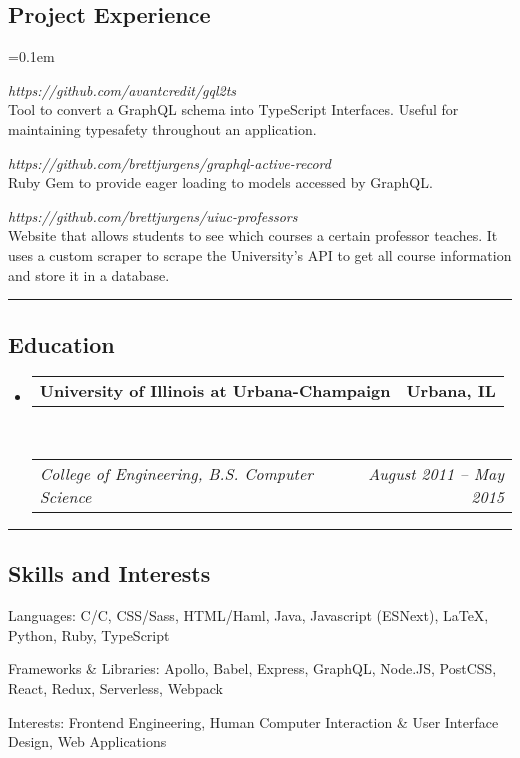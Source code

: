 \documentclass[10pt,letterpaper]{article}
\makeatletter
\newcommand{\headerrow}[2]
{\begin{tabular*}{\linewidth}{l@{\extracolsep{\fill}}r}
	#1 &
	#2 \\
\end{tabular*}}
\newcommand{\CPP}
{C\nolinebreak[4]\hspace{-.05em}\raisebox{.22ex}{\footnotesize\bf ++}}
\makeatother
\begin{document}
\subsection*{Project Experience}
\begin{description}[leftmargin=0pt]
	\parskip=0.1em
	
        \item[gql2ts] {\emph{https://github.com/avantcredit/gql2ts}}\hfill\\
        Tool to convert a GraphQL schema into TypeScript Interfaces. Useful for 
        maintaining typesafety throughout an application.

	\item[GraphQL Active Record] 
	{\emph{https://github.com/brettjurgens/graphql-active-record}}\hfill\\
	Ruby Gem to provide eager loading to models accessed by GraphQL.

	\item[UIUC Professors] {\emph{https://github.com/brettjurgens/uiuc-professors}}\hfill\\
      Website that allows students to see which courses a certain professor
      teaches. It uses a custom scraper to scrape the University's API to get
      all course information and store it in a database.
\end{description}

\hrule
\vspace{-0.4em}
\subsection*{Education}

\begin{itemize}
	\parskip=0.1em

	\item
	\headerrow
		{\textbf{University of Illinois at Urbana-Champaign}}
		{\textbf{Urbana, IL}}
	\\
	\headerrow
		{\emph{College of Engineering, B.S. Computer Science}}
		{\emph{August 2011 -- May 2015}}

\end{itemize}


\hrule
\vspace{-0.4em}
\subsection*{Skills and Interests}

\begin{description*}
	\item[Languages:]
       C/\CPP, CSS/Sass, HTML/Haml, Java, Javascript (ESNext), \LaTeX, Python, 
       Ruby, TypeScript
	\item[Frameworks \& Libraries:]
	Apollo, Babel, Express, GraphQL, Node.JS, PostCSS, React, Redux, Serverless, Webpack
	\item[Interests:]
	Frontend Engineering, Human Computer Interaction \& User Interface Design, Web
	Applications
\end{description*}
\end{document}

